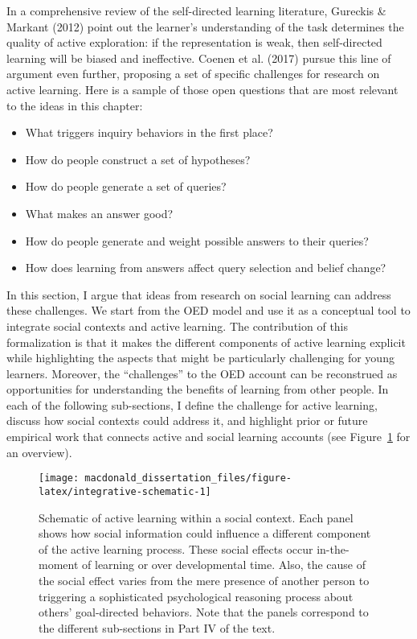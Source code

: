 \documentclass[oneside]{report}
\begin{document}
In a comprehensive review of the self-directed learning literature,
Gureckis \& Markant (2012) point out the learner's understanding of the
task determines the quality of active exploration: if the representation
is weak, then self-directed learning will be biased and ineffective.
Coenen et al. (2017) pursue this line of argument even further,
proposing a set of specific challenges for research on active learning.
Here is a sample of those open questions that are most relevant to the
ideas in this chapter:
\begin{itemize}
\tightlist
\item
  What triggers inquiry behaviors in the first place?
\item
  How do people construct a set of hypotheses?
\item
  How do people generate a set of queries?
\item
  What makes an answer good?
\item
  How do people generate and weight possible answers to their queries?
\item
  How does learning from answers affect query selection and belief
  change?
\end{itemize}
\noindent
In this section, I argue that ideas from research on social learning can
address these challenges. We start from the OED model and use it as a
conceptual tool to integrate social contexts and active learning. The
contribution of this formalization is that it makes the different
components of active learning explicit while highlighting the aspects
that might be particularly challenging for young learners. Moreover, the
``challenges'' to the OED account can be reconstrued as opportunities
for understanding the benefits of learning from other people. In each of
the following sub-sections, I define the challenge for active learning,
discuss how social contexts could address it, and highlight prior or
future empirical work that connects active and social learning accounts
(see Figure~\ref{fig:integrative-schematic} for an overview).
\begin{figure}[!t]

{\centering \texttt{[image: macdonald\_dissertation\_files/figure-latex/integrative-schematic-1]} 

}

\caption[Schematic of the integrative account of active learning within a social context.]{Schematic of active learning within a social context. Each panel shows how social information could influence a different component of the active learning process. These social effects occur in-the-moment of learning or over developmental time. Also, the cause of the social effect varies from the mere presence of another person to triggering a sophisticated psychological reasoning process about others' goal-directed behaviors. Note that the panels correspond to the different sub-sections in Part IV of the text.}\label{fig:integrative-schematic}
\end{figure}
\end{document}
